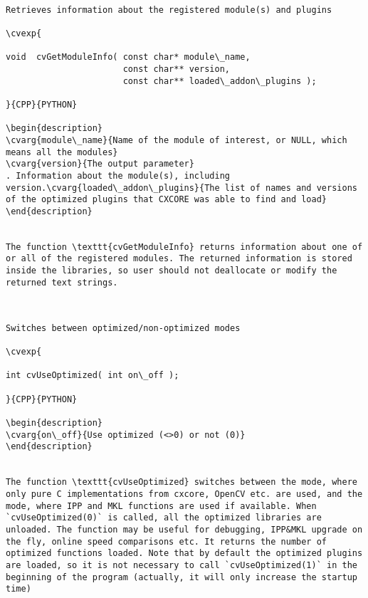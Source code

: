 \begin{verbatim}

Retrieves information about the registered module(s) and plugins

\cvexp{

void  cvGetModuleInfo( const char* module\_name,
                       const char** version,
                       const char** loaded\_addon\_plugins );

}{CPP}{PYTHON}

\begin{description}
\cvarg{module\_name}{Name of the module of interest, or NULL, which means all the modules}
\cvarg{version}{The output parameter}
. Information about the module(s), including version.\cvarg{loaded\_addon\_plugins}{The list of names and versions of the optimized plugins that CXCORE was able to find and load}
\end{description}


The function \texttt{cvGetModuleInfo} returns information about one of or all of the registered modules. The returned information is stored inside the libraries, so user should not deallocate or modify the returned text strings.


\end{verbatim}
\label{UseOptimized}
\begin{verbatim}

Switches between optimized/non-optimized modes

\cvexp{

int cvUseOptimized( int on\_off );

}{CPP}{PYTHON}

\begin{description}
\cvarg{on\_off}{Use optimized (<>0) or not (0)}
\end{description}


The function \texttt{cvUseOptimized} switches between the mode, where only pure C implementations from cxcore, OpenCV etc. are used, and the mode, where IPP and MKL functions are used if available. When `cvUseOptimized(0)` is called, all the optimized libraries are unloaded. The function may be useful for debugging, IPP&MKL upgrade on the fly, online speed comparisons etc. It returns the number of optimized functions loaded. Note that by default the optimized plugins are loaded, so it is not necessary to call `cvUseOptimized(1)` in the beginning of the program (actually, it will only increase the startup time)


\end{verbatim}
